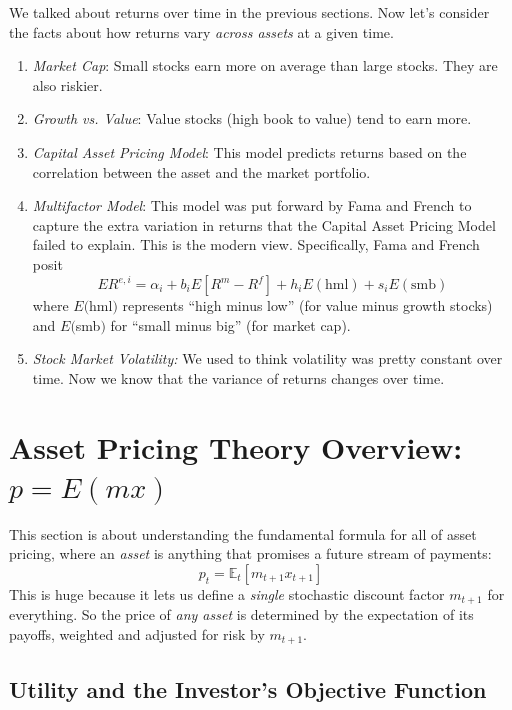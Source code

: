 \documentclass[12pt]{article}
\theoremstyle{plain}
\theoremstyle{definition}
\theoremstyle{remark}
\begin{document}
We talked about returns over time in the previous sections. Now
let's consider the facts about how returns vary \emph{across assets}
at a given time.
\begin{enumerate}
    \item {\sl Market Cap}: Small stocks earn more on average than
	large stocks.  They are also riskier.
    \item {\sl Growth vs. Value}: Value stocks (high book to value)
	tend to earn more.
    \item {\sl Capital Asset Pricing Model}: This model predicts
	returns based on the correlation between the asset and
	the market portfolio.
    \item {\sl Multifactor Model}: This model was put forward by
	Fama and French to capture the extra variation in returns
	that the Capital Asset Pricing Model failed to explain.
	This is the modern view. Specifically, Fama and French posit
	\begin{equation}
	    \label{ff3fm}
	    ER^{e,i} = \alpha_i + b_iE[R^m - R^f] + h_i E(\text{hml})
		+ s_i E(\text{smb})
	\end{equation}
	where $E($hml$)$ represents ``high minus low'' (for
	value minus growth stocks)
	and $E($smb$)$ for ``small minus big'' (for market cap).
    \item {\sl Stock Market Volatility:} We used to think volatility
	was pretty constant over time.  Now we know that the
	variance of returns changes over time.
\end{enumerate}

\clearpage
\section{Asset Pricing Theory Overview: $p=E(mx)$}

This section is about understanding the fundamental formula for
all of asset pricing, where an \emph{asset} is anything
that promises a future stream of payments:
\begin{equation}
    \label{pemx}
    p_t = \mathbb{E}_t[m_{t+1} x_{t+1}]
\end{equation}
This is huge because it lets us define a \emph{single} stochastic
discount factor $m_{t+1}$ for everything. So the price of \emph{any
asset} is determined by the expectation of its payoffs, weighted and
adjusted for risk by $m_{t+1}$.

\subsection{Utility and the Investor's Objective Function}
\end{document}
